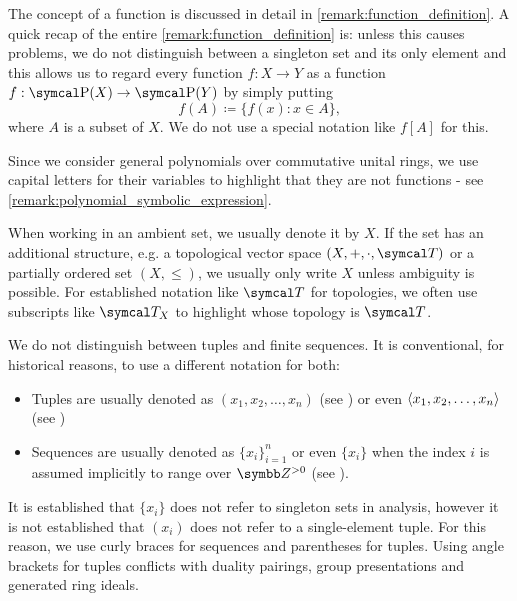 \begin{enumerate}
   The concept of a function is discussed in detail in \cref{remark:function_definition}. A quick recap of the entire \cref{remark:function_definition} is: unless this causes problems, we do not distinguish between a singleton set and its only element and this allows us to regard every function \( f: X \to Y \) as a function \( f: \Power(X) \to \Power(Y) \) by simply putting
  \begin{equation*}
    f(A) \coloneqq \{ f(x) \colon x \in A \},
  \end{equation*}
  where \( A \) is a subset of \( X \). We do not use a special notation like \( f[A] \) for this.

   Since we consider general polynomials over commutative unital rings, we use capital letters for their variables to highlight that they are not functions - see \cref{remark:polynomial_symbolic_expression}.

   When working in an ambient set, we usually denote it by \( X \). If the set has an additional structure, e.g. a topological vector space \( (X, +, \cdot, \Cal{T}) \) or a partially ordered set \( (X, \leq) \), we usually only write \( X \) unless ambiguity is possible. For established notation like \( \Cal{T} \) for topologies, we often use subscripts like \( \Cal{T}_X \) to highlight whose topology is \( \Cal{T} \).

   We do not distinguish between tuples and finite sequences. It is conventional, for historical reasons, to use a different notation for both:

  \begin{itemize}
    \item Tuples are usually denoted as \( (x_1, x_2, \ldots, x_n) \) (see \cite[1]{Engelking1989}) or even \( \left\langle x_1, x_2, \ldots, x_n \right\rangle \) (see \cite[42]{Enderton1977})
    \item Sequences are usually denoted as \( \{ x_i \}_{i=1}^n \) or even \( \{ x_i \} \) when the index \( i \) is assumed implicitly to range over \( \Z^{>0} \) (see \cite[3.1]{Rudin1991}).
  \end{itemize}

  It is established that \( \{ x_i \} \) does not refer to singleton sets in analysis, however it is not established that \( ( x_i ) \) does not refer to a single-element tuple. For this reason, we use curly braces for sequences and parentheses for tuples. Using angle brackets for tuples conflicts with duality pairings, group presentations and generated ring ideals.
\end{enumerate}
